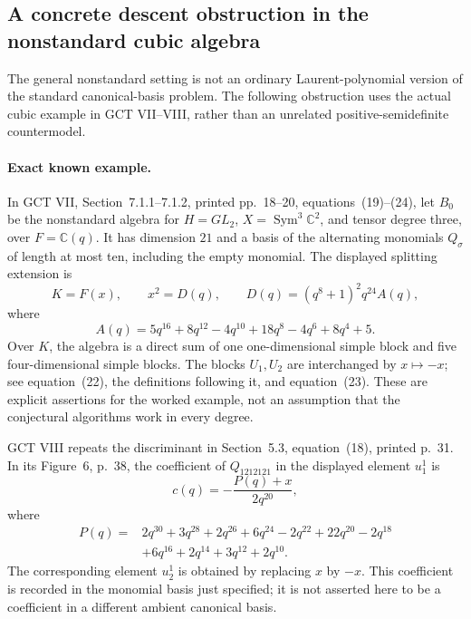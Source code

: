 \subsection{A concrete descent obstruction in the nonstandard cubic algebra}

The general nonstandard setting is not an ordinary Laurent-polynomial
version of the standard canonical-basis problem. The following obstruction
uses the actual cubic example in GCT VII--VIII, rather than an unrelated
positive-semidefinite countermodel.

\paragraph{Exact known example.}
In GCT VII, Section~7.1.1--7.1.2, printed pp.~18--20,
equations~(19)--(24), let $B_0$ be the nonstandard algebra for
$H=GL_2$, $X=\operatorname{Sym}^3\mathbb C^2$, and tensor degree three,
over $F=\mathbb C(q)$. It has dimension $21$ and a basis of the
alternating monomials $Q_\sigma$ of length at most ten, including
the empty monomial. The displayed splitting extension is
\[
 K=F(x),\qquad x^2=D(q),\qquad
 D(q)=(q^8+1)^2q^{24}A(q),
 \tag{P-F36a}
\]
where
\[
 A(q)=5q^{16}+8q^{12}-4q^{10}+18q^8-4q^6+8q^4+5.
 \tag{P-F36b}
\]
Over $K$, the algebra is a direct sum of one one-dimensional
simple block and five four-dimensional simple blocks.
The blocks $U_1,U_2$ are interchanged by $x\mapsto-x$;
see equation~(22), the definitions following it, and equation~(23).
These are explicit assertions for the worked example, not an
assumption that the conjectural algorithms work in every degree.

GCT VIII repeats the discriminant in Section~5.3, equation~(18),
printed p.~31. In its Figure~6, p.~38, the coefficient of
$Q_{1212121}$ in the displayed element $u_1^1$ is
\[
 c(q)=-\frac{P(q)+x}{2q^{20}},
 \tag{P-F36c}
\]
where
\[
 \begin{split}
 P(q)={}&2q^{30}+3q^{28}+2q^{26}+6q^{24}-2q^{22}
          +22q^{20}-2q^{18}\\
       &+6q^{16}+2q^{14}+3q^{12}+2q^{10}.
 \end{split}
\]
The corresponding element $u_2^1$ is obtained by replacing $x$ by
$-x$. This coefficient is recorded in the monomial basis just
specified; it is not asserted here to be a coefficient in a
different ambient canonical basis.

